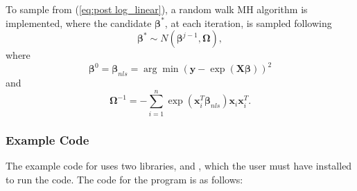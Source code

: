 \documentclass[article]{jss}
\begin{document}
To sample from (\ref{eq:post log_linear}), a random walk MH algorithm
is implemented, where the candidate $\bm{\beta}^{*}$, at each iteration,
is sampled following \begin{equation}
\bm{\beta}^{*}\sim N\left(\bm{\beta}^{j-1},\bm{\Omega}\right),\label{eq:candidate log-linear}\end{equation}
 where\[
\bm{\beta}^{0}=\bm{\beta}_{nls}=\arg\min\left(\bm{y}-\exp\left(\bm{X}\bm{\beta}\right)\right)^{2}\]
 and\[
\bm{\Omega}^{-1}=-\sum_{i=1}^{n}\exp\left(\bm{x}_{i}^{T}\bm{\beta}_{nls}\right)\bm{x}_{i}\bm{x}_{i}^{T}.\]



\subsubsection{Example Code}

The example code for  uses two 
libraries,  and , which the user must have
installed to run the code.  The code for the program
is as follows:
\end{document}
